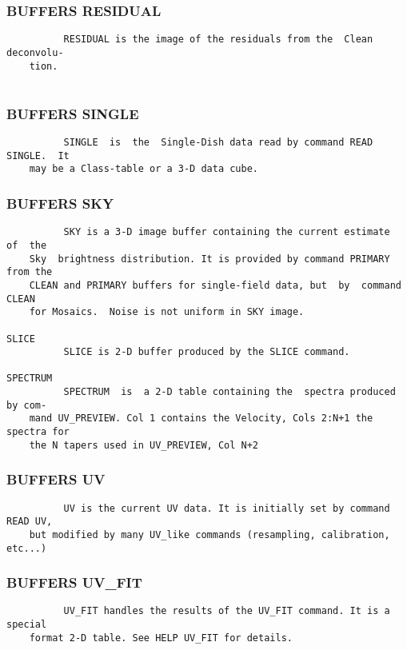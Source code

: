 \subsubsection{BUFFERS RESIDUAL}
\begin{verbatim}
          RESIDUAL is the image of the residuals from the  Clean  deconvolu-
    tion.


\end{verbatim}
\subsubsection{BUFFERS SINGLE}
\begin{verbatim}
          SINGLE  is  the  Single-Dish data read by command READ SINGLE.  It
    may be a Class-table or a 3-D data cube.

\end{verbatim}
\subsubsection{BUFFERS SKY}
\begin{verbatim}
          SKY is a 3-D image buffer containing the current estimate  of  the
    Sky  brightness distribution. It is provided by command PRIMARY from the
    CLEAN and PRIMARY buffers for single-field data, but  by  command  CLEAN
    for Mosaics.  Noise is not uniform in SKY image.

SLICE
          SLICE is 2-D buffer produced by the SLICE command.

SPECTRUM
          SPECTRUM  is  a 2-D table containing the  spectra produced by com-
    mand UV_PREVIEW. Col 1 contains the Velocity, Cols 2:N+1 the spectra for
    the N tapers used in UV_PREVIEW, Col N+2

\end{verbatim}
\subsubsection{BUFFERS UV}
\begin{verbatim}
          UV is the current UV data. It is initially set by command READ UV,
    but modified by many UV_like commands (resampling, calibration, etc...)

\end{verbatim}
\subsubsection{BUFFERS UV\_FIT}
\begin{verbatim}
          UV_FIT handles the results of the UV_FIT command. It is a  special
    format 2-D table. See HELP UV_FIT for details.

\end{verbatim}
